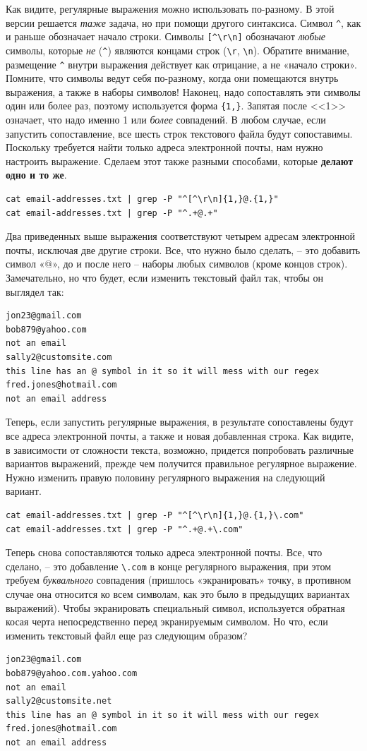 \documentclass[12pt]{article}
\begin{document}
Как видите, регулярные выражения можно использовать по-разному. В этой
версии решается \emph{таже} задача, но при помощи другого синтаксиса.
Символ \texttt{\^{}}, как и раньше обозначает начало строки. Символы
\texttt{{[}\^{}\textbackslash{}r\textbackslash{}n{]}} обозначают
\emph{любые} символы, которые \emph{не} (\texttt{\^{}}) являются концами
строк (\texttt{\textbackslash{}r}, \texttt{\textbackslash{}n}). Обратите
внимание, размещение \texttt{\^{}} внутри выражения действует как
отрицание, а не «начало строки». Помните, что символы ведут себя
по-разному, когда они помещаются внутрь выражения, а также в наборы
символов! Наконец, надо сопоставлять эти символы один или более раз,
поэтому используется форма \texttt{\{1,\}}. Запятая после <<1>> означает,
что надо именно 1 или \emph{более} совпадений. В любом случае, если
запустить сопоставление, все шесть строк текстового файла будут
сопоставимы. Поскольку требуется найти только адреса электронной почты,
нам нужно настроить выражение. Сделаем этот также разными способами,
которые \textbf{делают одно и то же}.
\begin{verbatim}
cat email-addresses.txt | grep -P "^[^\r\n]{1,}@.{1,}"
cat email-addresses.txt | grep -P "^.+@.+"
\end{verbatim}
Два приведенных выше выражения соответствуют четырем адресам электронной
почты, исключая две другие строки. Все, что нужно было сделать, -- это
добавить символ «@», до и после него -- наборы любых символов (кроме
концов строк). Замечательно, но что будет, если изменить текстовый файл
так, чтобы он выглядел так:
\begin{verbatim}
jon23@gmail.com
bob879@yahoo.com
not an email
sally2@customsite.com
this line has an @ symbol in it so it will mess with our regex
fred.jones@hotmail.com
not an email address
\end{verbatim}
Теперь, если запустить регулярные выражения, в результате сопоставлены
будут все адреса электронной почты, а также и новая добавленная строка.
Как видите, в зависимости от сложности текста, возможно, придется
попробовать различные вариантов выражений, прежде чем получится правильное
регулярное выражение. Нужно изменить правую половину регулярного
выражения на следующий вариант.
\begin{verbatim}
cat email-addresses.txt | grep -P "^[^\r\n]{1,}@.{1,}\.com"
cat email-addresses.txt | grep -P "^.+@.+\.com"
\end{verbatim}

Теперь снова сопоставляются только адреса электронной почты. Все, что
сделано, -- это добавление \verb|\.com| в конце
регулярного выражения, при этом требуем \emph{буквального}
совпадения (пришлось «экранировать» точку, в противном случае
она относится ко всем символам, как это было в предыдущих вариантах
выражений). Чтобы экранировать специальный символ, используется обратная
косая черта непосредственно перед экранируемым символом. Но что, если
изменить текстовый файл еще раз следующим образом?
\begin{verbatim}
jon23@gmail.com
bob879@yahoo.com.yahoo.com
not an email
sally2@customsite.net
this line has an @ symbol in it so it will mess with our regex
fred.jones@hotmail.com
not an email address
\end{verbatim}
\end{document}
